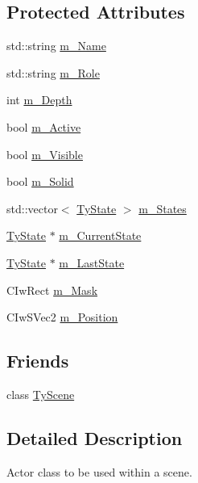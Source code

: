 \subsection*{Protected Attributes}
\begin{DoxyCompactItemize}
\item 
std::string \hyperlink{class_i_ty_actor_afdfb0e1ed5a47085f52f95f276010bb6}{m\_\-Name}
\item 
std::string \hyperlink{class_i_ty_actor_a92de9e18b7a31fc93b8bb775922078d4}{m\_\-Role}
\item 
int \hyperlink{class_i_ty_actor_ac075325d62fdcda89c2a91f2c1298376}{m\_\-Depth}
\item 
bool \hyperlink{class_i_ty_actor_ae460cd48bef240e11cfa5df7a505cbe9}{m\_\-Active}
\item 
bool \hyperlink{class_i_ty_actor_a1019d46cd7502694e5f69c7c4c7be23e}{m\_\-Visible}
\item 
bool \hyperlink{class_i_ty_actor_a0365728019201a011e657ab56e36d06a}{m\_\-Solid}
\item 
std::vector$<$ \hyperlink{class_ty_state}{TyState} $>$ \hyperlink{class_i_ty_actor_aa07b4abe49314068f26fc471b994791e}{m\_\-States}
\item 
\hyperlink{class_ty_state}{TyState} $\ast$ \hyperlink{class_i_ty_actor_a6da0cfc7b9084c69114f601742413a2f}{m\_\-CurrentState}
\item 
\hyperlink{class_ty_state}{TyState} $\ast$ \hyperlink{class_i_ty_actor_a12954e3e8f5596a65c239cf3d126f7a1}{m\_\-LastState}
\item 
CIwRect \hyperlink{class_i_ty_actor_abd0ddacb8e677d2d36ead794883dee4c}{m\_\-Mask}
\item 
CIwSVec2 \hyperlink{class_i_ty_actor_a296ffe4ccf5fad06daf002837b9ec128}{m\_\-Position}
\end{DoxyCompactItemize}
\subsection*{Friends}
\begin{DoxyCompactItemize}
\item 
class \hyperlink{class_i_ty_actor_ab2b75df334224ada5c17385cb5eeedc6}{TyScene}
\end{DoxyCompactItemize}


\subsection{Detailed Description}
Actor class to be used within a scene. 

